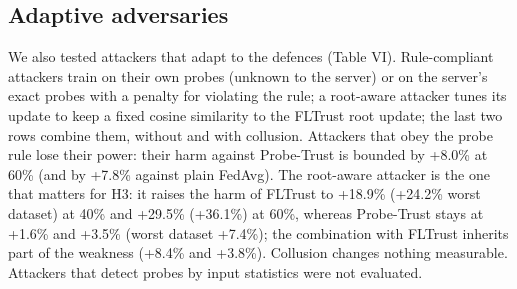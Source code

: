 \documentclass[journal]{IEEEtran}
\begin{document}
\subsection{Adaptive adversaries}
We also tested attackers that adapt to the defences (Table VI). Rule-compliant attackers train on their own probes (unknown to the server) or on the server's exact probes with a penalty for violating the rule; a root-aware attacker tunes its update to keep a fixed cosine similarity to the FLTrust root update; the last two rows combine them, without and with collusion. Attackers that obey the probe rule lose their power: their harm against Probe-Trust is bounded by +8.0\% at 60\% (and by +7.8\% against plain FedAvg). The root-aware attacker is the one that matters for H3: it raises the harm of FLTrust to +18.9\% (+24.2\% worst dataset) at 40\% and +29.5\% (+36.1\%) at 60\%, whereas Probe-Trust stays at +1.6\% and +3.5\% (worst dataset +7.4\%); the combination with FLTrust inherits part of the weakness (+8.4\% and +3.8\%). Collusion changes nothing measurable. Attackers that detect probes by input statistics were not evaluated.
\end{document}
